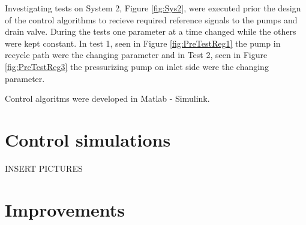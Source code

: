 Investigating tests on System 2, Figure \ref{fig:Sys2}, were executed prior the design of the control algorithms to recieve required reference signals to the pumps and drain valve. During the tests one parameter at a time changed while the others were kept constant. In test 1, seen in Figure \ref{fig:PreTestReg1} the pump in recycle path were the changing parameter and in Test 2, seen in Figure \ref{fig:PreTestReg3} the pressurizing pump on inlet side were the changing parameter.




Control algoritms were developed in Matlab - Simulink. 

\section{Control simulations}

INSERT PICTURES



\section{Improvements}

